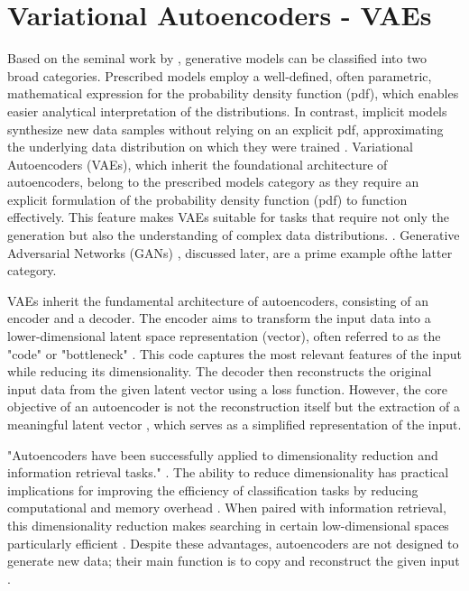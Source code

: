 \section{Variational Autoencoders - VAEs}
\label{VAEs}

Based on the seminal work by \citeauthor{diggleImplicitPrescribed}, generative models can be classified into two broad categories. Prescribed models employ a well-defined, often parametric, mathematical expression for the probability density function (pdf), which enables easier analytical interpretation of the distributions. In contrast, implicit models synthesize new data samples without relying on an explicit pdf, approximating the underlying data distribution on which they were trained \citep{diggleImplicitPrescribed}. Variational Autoencoders (VAEs), which inherit the foundational architecture of autoencoders, belong to the prescribed models category as they require an explicit formulation of the probability density function (pdf) to function effectively. This feature makes VAEs suitable for tasks that require not only the generation but also the understanding of complex data distributions. \citep{kingmaVAE,rezendeVAE,GoodfellowDeepLearning}. Generative Adversarial Networks (GANs) \citep{goodfellowGAN}, discussed later, are a prime example ofthe latter category.

VAEs inherit the fundamental architecture of autoencoders, consisting of an encoder and a decoder. The encoder aims to transform the input data into a lower-dimensional latent space representation (vector), often referred to as the "code" or "bottleneck" \citep{hintonCode, GoodfellowDeepLearning}. This code captures the most relevant features of the input while reducing its dimensionality. The decoder then reconstructs the original input data from the given latent vector using a loss function. However, the core objective of an autoencoder is not the reconstruction itself but the extraction of a meaningful latent vector \citep{GoodfellowDeepLearning}, which serves as a simplified representation of the input.

"Autoencoders have been successfully applied to dimensionality reduction and information retrieval tasks." \citep{GoodfellowDeepLearning}. The ability to reduce dimensionality has practical implications for improving the efficiency of classification tasks by reducing computational and memory overhead \citep{GoodfellowDeepLearning}. When paired with information retrieval, this dimensionality reduction makes searching in certain low-dimensional spaces particularly efficient \citep{GoodfellowDeepLearning}. Despite these advantages, autoencoders are not designed to generate new data; their main function is to copy and reconstruct the given input \citep{GoodfellowDeepLearning}.

